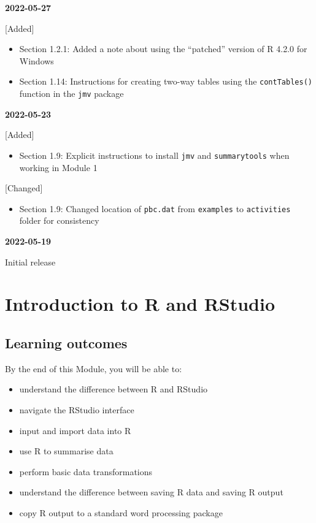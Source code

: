 \documentclass[
]{memoir}
\providecommand{\tightlist}{%
  \setlength{\itemsep}{0pt}\setlength{\parskip}{0pt}}
\begin{document}
\textbf{2022-05-27}

{[}Added{]}

\begin{itemize}
\tightlist
\item
  Section 1.2.1: Added a note about using the ``patched'' version of R 4.2.0 for Windows
\item
  Section 1.14: Instructions for creating two-way tables using the \texttt{contTables()} function in the \texttt{jmv} package
\end{itemize}

\textbf{2022-05-23}

{[}Added{]}

\begin{itemize}
\tightlist
\item
  Section 1.9: Explicit instructions to install \texttt{jmv} and \texttt{summarytools} when working in Module 1
\end{itemize}

{[}Changed{]}

\begin{itemize}
\tightlist
\item
  Section 1.9: Changed location of \texttt{pbc.dat} from \texttt{examples} to \texttt{activities} folder for consistency
\end{itemize}

\textbf{2022-05-19}

Initial release

\hypertarget{introduction-to-r-and-rstudio}{%
\chapter{Introduction to R and RStudio}\label{introduction-to-r-and-rstudio}}

\hypertarget{learning-outcomes}{%
\section*{Learning outcomes}\label{learning-outcomes}}

By the end of this Module, you will be able to:

\begin{itemize}
\tightlist
\item
  understand the difference between R and RStudio
\item
  navigate the RStudio interface
\item
  input and import data into R
\item
  use R to summarise data
\item
  perform basic data transformations
\item
  understand the difference between saving R data and saving R output
\item
  copy R output to a standard word processing package
\end{itemize}
\end{document}
